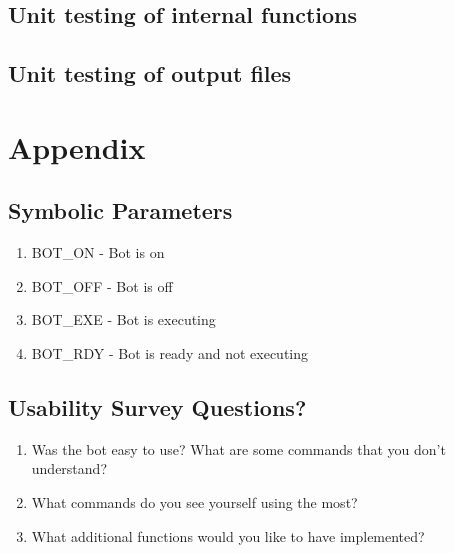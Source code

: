 \documentclass[12pt, titlepage]{article}
\begin{document}
\subsection{Unit testing of internal functions}
		
\subsection{Unit testing of output files}		


\iffalse




\fi

\newpage

\section{Appendix}


\subsection{Symbolic Parameters}
\begin{enumerate}
\item BOT\_ON - Bot is on
\item BOT\_OFF - Bot is off
\item BOT\_EXE - Bot is executing
\item BOT\_RDY - Bot is ready and not executing

\end{enumerate}

\subsection{Usability Survey Questions?}

\begin{enumerate}
\item Was the bot easy to use? What are some commands that you don't understand?

\item What commands do you see yourself using the most?

\item What additional functions would you like to have implemented?
\end{enumerate}	
\end{document}
